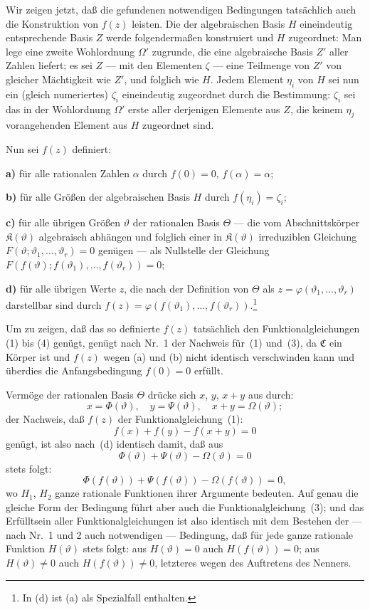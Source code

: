 \documentclass[12pt,a4paper]{article}
\begin{document}
Wir zeigen jetzt, da\ss{} die gefundenen notwendigen Bedingungen tats\"achlich auch die Konstruktion von $f(z)$ leisten. Die der algebraischen Basis $H$ eineindeutig entsprechende Basis $Z$ werde folgenderma\ss en konstruiert und $H$ zugeordnet: Man lege eine zweite Wohlordnung $\Omega'$ zugrunde, die eine algebraische Basis $Z'$ aller Zahlen liefert; es sei $Z$ --- mit den Elementen $\zeta$ --- eine Teilmenge von $Z'$ von gleicher M\"achtigkeit wie $Z'$, und folglich wie $H$. Jedem Element $\eta_i$ von $H$ sei nun ein (gleich numeriertes) $\zeta_i$ eineindeutig zugeordnet durch die Bestimmung: $\zeta_i$ sei das in der Wohlordnung $\Omega'$ erste aller derjenigen Elemente aus $Z$, die keinem $\eta_j$ vorangehenden Element aus $H$ zugeordnet sind.

Nun sei $f(z)$ definiert:

\textbf{a)} f\"ur alle rationalen Zahlen $\alpha$ durch $f(0) = 0$, $f(\alpha) = \alpha$;

\textbf{b)} f\"ur alle Gr\"o\ss en der algebraischen Basis $H$ durch $f(\eta_i) = \zeta_i$;

\textbf{c)} f\"ur alle \"ubrigen Gr\"o\ss en $\vartheta$ der rationalen Basis $\Theta$ --- die vom Abschnittsk\"orper $\mathfrak{K}(\vartheta)$ algebraisch abh\"angen und folglich einer in $\mathfrak{K}(\vartheta)$ irreduziblen Gleichung $F(\vartheta; \vartheta_1, \ldots, \vartheta_r) = 0$ gen\"ugen --- als Nullstelle der Gleichung $F(f(\vartheta); f(\vartheta_1), \ldots, f(\vartheta_r)) = 0$;

\textbf{d)} f\"ur alle \"ubrigen Werte $z$, die nach der Definition von $\Theta$ als $z = \varphi(\vartheta_1, \ldots, \vartheta_r)$ darstellbar sind durch $f(z) = \varphi(f(\vartheta_1), \ldots, f(\vartheta_r))$.\footnote{In (d) ist (a) als Spezialfall enthalten.}

Um zu zeigen, da\ss{} das so definierte $f(z)$ tats\"achlich den Funktionalgleichungen (1) bis (4) gen\"ugt, gen\"ugt nach Nr.\ 1 der Nachweis f\"ur~(1) und~(3), da $\mathfrak{C}$ ein K\"orper ist und $f(z)$ wegen (a) und (b) nicht identisch verschwinden kann und \"uberdies die Anfangsbedingung $f(0) = 0$ erf\"ullt.

Verm\"oge der rationalen Basis $\Theta$ dr\"ucke sich $x$, $y$, $x+y$ aus durch:
\[x = \Phi(\vartheta), \quad y = \Psi(\vartheta), \quad x+y = \Omega(\vartheta);\]
der Nachweis, da\ss{} $f(z)$ der Funktionalgleichung~(1):
\[f(x) + f(y) - f(x+y) = 0\]
gen\"ugt, ist also nach~(d) identisch damit, da\ss{} aus
\[\Phi(\vartheta) + \Psi(\vartheta) - \Omega(\vartheta) = 0\]
stets folgt:
\[\Phi(f(\vartheta)) + \Psi(f(\vartheta)) - \Omega(f(\vartheta)) = 0,\]
wo $H_1$, $H_2$ ganze rationale Funktionen ihrer Argumente bedeuten. Auf genau die gleiche Form der Bedingung f\"uhrt aber auch die Funktionalgleichung~(3); und das Erf\"ulltsein aller Funktionalgleichungen ist also identisch mit dem Bestehen der --- nach Nr.\ 1 und 2 auch notwendigen --- Bedingung, da\ss{} f\"ur jede ganze rationale Funktion $H(\vartheta)$ stets folgt: aus $H(\vartheta) = 0$ auch $H(f(\vartheta)) = 0$; aus $H(\vartheta) \neq 0$ auch $H(f(\vartheta)) \neq 0$, letzteres wegen des Auftretens des Nenners.
\end{document}
